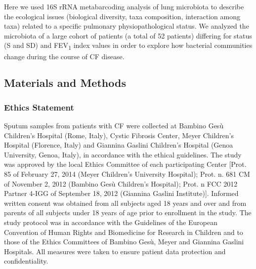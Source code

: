 Here we used 16S rRNA metabarcoding analysis of lung microbiota to describe the ecological issues (biological diversity, taxa composition, interaction among taxa) related to a specific pulmonary physiopathological status. We analyzed the microbiota of a large cohort of patients (a total of 52 patients) differing for status (S and SD) and FEV\textsubscript{1} index values in order to explore how bacterial communities change during the course of CF disease.\\

\subsection{Materials and Methods}

\subsubsection{Ethics Statement}
Sputum samples from patients with CF were collected at Bambino Ges\`u Children's Hospital (Rome, Italy), Cystic Fibrosis Center, Meyer Children's Hospital (Florence, Italy) and Giannina Gaslini Children's Hospital (Genoa University, Genoa, Italy), in accordance with the ethical guidelines. The study was approved by the local Ethics Committee of each participating Center [Prot. 85 of February 27, 2014 (Meyer Children's University Hospital); Prot. n. 681 CM of November 2, 2012 (Bambino Ges\`u Children's Hospital); Prot. n FCC 2012 Partner 4-IGG of September 18, 2012 (Giannina Gaslini Institute)]. Informed written consent was obtained from all subjects aged 18 years and over and from parents of all subjects under 18 years of age prior to enrollment in the study. The study protocol was in accordance with the Guidelines of the European Convention of Human Rights and Biomedicine for Research in Children and to those of the Ethics Committees of Bambino Ges\`u, Meyer and Giannina Gaslini Hospitals. All measures were taken to ensure patient data protection and confidentiality.\\


